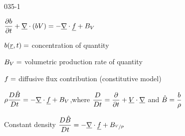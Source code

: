 \begin{mitframe}{035-1}

        
\begin{listone}

\item$\dfrac{\partial{b}}{\partial{t}}+\gradop\cdot(b\vol)=-\gradop\cdot\uline{\fug}+\exergy_{\vol}$
\item $b(\uline{\pos},t)=$ concentration of quantity
\item $\exergy_{\vol} =$ volumetric production rate of quantity

\item $\fug =$ diffusive flux contribution (constitutive model)

\item $\dens\dfrac{\elecdisplace\hat{\exergy}}{\elecdisplace{t}}=-\gradop\cdot\uline{\fug}+\exergy_{\vol}$,where $\dfrac{\elecdisplace}{\elecdisplace{t}}=\dfrac{\partial}{\partial{t}}+\uline{\vol}\cdot\gradop$ and $\hat{\exergy}=\dfrac{b}{\dens}$

				\begin{listtwo}
				\item Constant density $\dfrac{\elecdisplace\hat{\exergy}}{\elecdisplace{t}}=-\gradop\cdot\uline{\fug}+\exergy_{\sfrac{\vol}{\p}}$
            
				\end{listtwo}
\end{listone}
\end{mitframe}